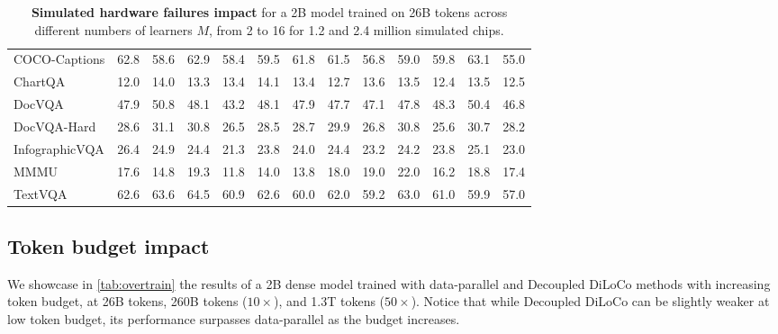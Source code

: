 \documentclass[11pt, a4paper, twocolumn, copyright, google]{google}
\begin{document}
\begin{table}[ht]
\begin{tabular}{l cccc cccc cccc}
COCO-Captions & 62.8 & 58.6 & 62.9 & 58.4 & 59.5 & 61.8 & 61.5 & 56.8 & 59.0 & 59.8 & 63.1 & 55.0 \\
ChartQA & 12.0 & 14.0 & 13.3 & 13.4 & 14.1 & 13.4 & 12.7 & 13.6 & 13.5 & 12.4 & 13.5 & 12.5 \\
DocVQA & 47.9 & 50.8 & 48.1 & 43.2 & 48.1 & 47.9 & 47.7 & 47.1 & 47.8 & 48.3 & 50.4 & 46.8 \\
DocVQA-Hard & 28.6 & 31.1 & 30.8 & 26.5 & 28.5 & 28.7 & 29.9 & 26.8 & 30.8 & 25.6 & 30.7 & 28.2 \\
InfographicVQA & 26.4 & 24.9 & 24.4 & 21.3 & 23.8 & 24.0 & 24.4 & 23.2 & 24.2 & 23.8 & 25.1 & 23.0 \\
MMMU & 17.6 & 14.8 & 19.3 & 11.8 & 14.0 & 13.8 & 18.0 & 19.0 & 22.0 & 16.2 & 18.8 & 17.4 \\
TextVQA & 62.6 & 63.6 & 64.5 & 60.9 & 62.6 & 60.0 & 62.0 & 59.2 & 63.0 & 61.0 & 59.9 & 57.0 \\
\bottomrule
\end{tabular}
\caption{\textbf{Simulated hardware failures impact} for a 2B model trained on 26B tokens across different numbers of learners $M$, from 2 to 16 for 1.2 and 2.4 million simulated chips.}
\label{tab:tab_hw_failures_across_m}
\end{table}

\subsection{Token budget impact}

We showcase in \autoref{tab:overtrain} the results of a 2B dense model trained with data-parallel and Decoupled DiLoCo methods with increasing token budget, at 26B tokens, 260B tokens ($10\times$), and 1.3T tokens ($50\times$). Notice that while Decoupled DiLoCo can be slightly weaker at low token budget, its performance surpasses data-parallel as the budget increases.
\end{document}
